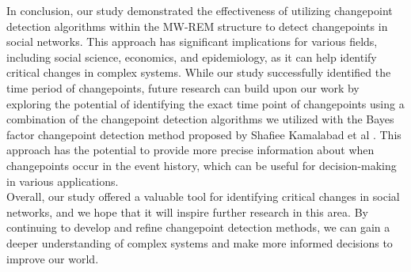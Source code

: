 \documentclass[]{interact}
\theoremstyle{plain}%
\theoremstyle{definition}
\theoremstyle{remark}
\begin{document}
	In conclusion, our study demonstrated the effectiveness of utilizing changepoint detection algorithms within the MW-REM structure to detect changepoints in social networks. This approach has significant implications for various fields, including social science, economics, and epidemiology, as it can help identify critical changes in complex systems. While our study successfully identified the time period of changepoints, future research can build upon our work by exploring the potential of identifying the exact time point of changepoints using a combination of the changepoint detection algorithms we utilized with the Bayes factor changepoint detection method proposed by Shafiee Kamalabad et al \cite{shafieekamalabadWhatPointChange2023}. This approach has the potential to provide more precise information about when changepoints occur in the event history, which can be useful for decision-making in various applications. \\
	
	Overall, our study offered a valuable tool for identifying critical changes in social networks, and we hope that it will inspire further research in this area. By continuing to develop and refine changepoint detection methods, we can gain a deeper understanding of complex systems and make more informed decisions to improve our world. \\
	
	
	\newpage
	
	\nocite{*} %
	
	
	
\end{document}
